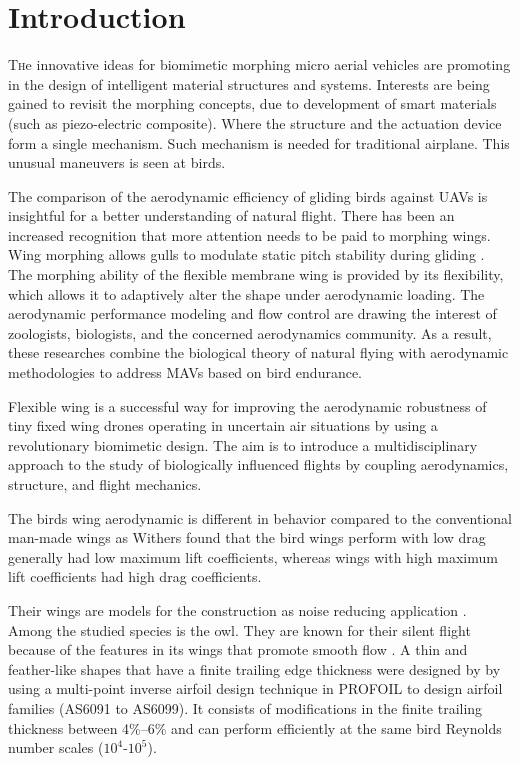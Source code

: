 

\section{Introduction}
\lettrine{T}he innovative ideas for biomimetic morphing micro aerial vehicles are promoting in the design of intelligent material structures and systems. 
%
Interests are being gained to revisit the morphing concepts, due to development of smart materials (such as piezo-electric composite). 
%
Where the structure and the actuation device form a single mechanism. 
%
Such mechanism is needed for traditional airplane. This unusual maneuvers is seen at birds. 

The comparison of the aerodynamic efficiency of gliding birds against UAVs is insightful for a better understanding of natural flight.
%
There has been an increased recognition that more attention needs to be paid to morphing wings. Wing morphing allows gulls to modulate static pitch stability during gliding \cite{Harvey2022GullMorphing}. 
%
The morphing ability of the flexible membrane wing is provided by its flexibility, which allows it to adaptively alter the shape under aerodynamic loading.
%
The aerodynamic performance modeling and flow control are drawing the interest of zoologists, biologists, and the concerned aerodynamics community.
%
As a result, these researches combine the biological theory of natural flying with aerodynamic methodologies to address MAVs based on bird endurance.

Flexible wing is a successful way for improving the aerodynamic robustness of tiny fixed wing drones operating in uncertain air situations by using a revolutionary biomimetic design.
%
The aim is to introduce a multidisciplinary approach to the study of biologically influenced flights by coupling aerodynamics, structure, and flight mechanics.
%

The birds wing aerodynamic is different in behavior compared to the conventional man-made wings as Withers \cite{Withers1981} found that the bird wings perform with low drag generally had low maximum lift coefficients, whereas wings with high maximum lift coefficients had high drag coefficients. 

Their wings are models for the construction as noise reducing application \cite{Bachmann2010}.
%
Among the studied species is the owl. They are known for their silent flight because of the features in its wings that promote smooth flow \cite{jaworski2020,geyer2016}.
% 
A thin and feather-like shapes that have a finite trailing edge thickness were designed by \citet{ananda2018aerodynamic} by using a multi-point inverse airfoil design technique in PROFOIL \cite{AirfoilDesignSoftwarefortheWeb} to design airfoil families (AS6091 to AS6099).
%
It consists of modifications in the finite trailing thickness between 4\%–6\% and can perform efficiently at the same bird Reynolds number scales ($10^4$-$10^5$).

